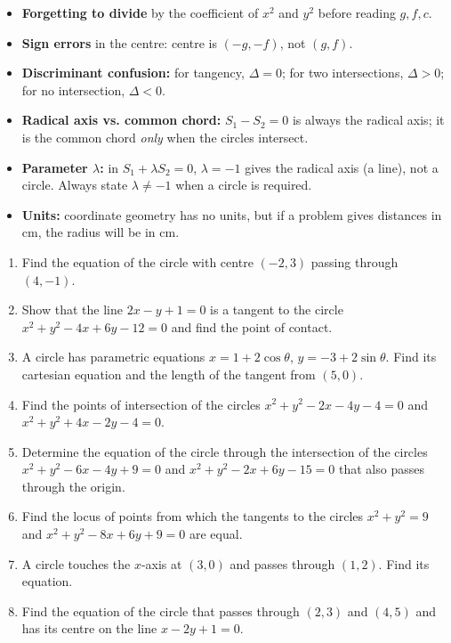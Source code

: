 \documentclass[11pt]{article}
\begin{document}
\begin{attention}
\begin{itemize}
\item \textbf{Forgetting to divide} by the coefficient of $x^2$ and $y^2$ before reading $g,f,c$.
\item \textbf{Sign errors} in the centre: centre is $(-g,-f)$, not $(g,f)$.
\item \textbf{Discriminant confusion:} for tangency, $\Delta=0$; for two intersections, $\Delta>0$; for no intersection, $\Delta<0$.
\item \textbf{Radical axis vs. common chord:} $S_1-S_2=0$ is always the radical axis; it is the common chord \emph{only} when the circles intersect.
\item \textbf{Parameter $\lambda$:} in $S_1+\lambda S_2=0$, $\lambda=-1$ gives the radical axis (a line), not a circle. Always state $\lambda\neq-1$ when a circle is required.
\item \textbf{Units:} coordinate geometry has no units, but if a problem gives distances in cm, the radius will be in cm.
\end{itemize}
\end{attention}

\begin{exercice}
\begin{enumerate}
\item Find the equation of the circle with centre $(-2,3)$ passing through $(4,-1)$.
\item Show that the line $2x-y+1=0$ is a tangent to the circle $x^2+y^2-4x+6y-12=0$ and find the point of contact.
\item A circle has parametric equations $x=1+2\cos\theta$, $y=-3+2\sin\theta$. Find its cartesian equation and the length of the tangent from $(5,0)$.
\item Find the points of intersection of the circles $x^2+y^2-2x-4y-4=0$ and $x^2+y^2+4x-2y-4=0$.
\item Determine the equation of the circle through the intersection of the circles $x^2+y^2-6x-4y+9=0$ and $x^2+y^2-2x+6y-15=0$ that also passes through the origin.
\item Find the locus of points from which the tangents to the circles $x^2+y^2=9$ and $x^2+y^2-8x+6y+9=0$ are equal.
\item A circle touches the $x$-axis at $(3,0)$ and passes through $(1,2)$. Find its equation.
\item Find the equation of the circle that passes through $(2,3)$ and $(4,5)$ and has its centre on the line $x-2y+1=0$.
\end{enumerate}
\end{exercice}
\end{document}
